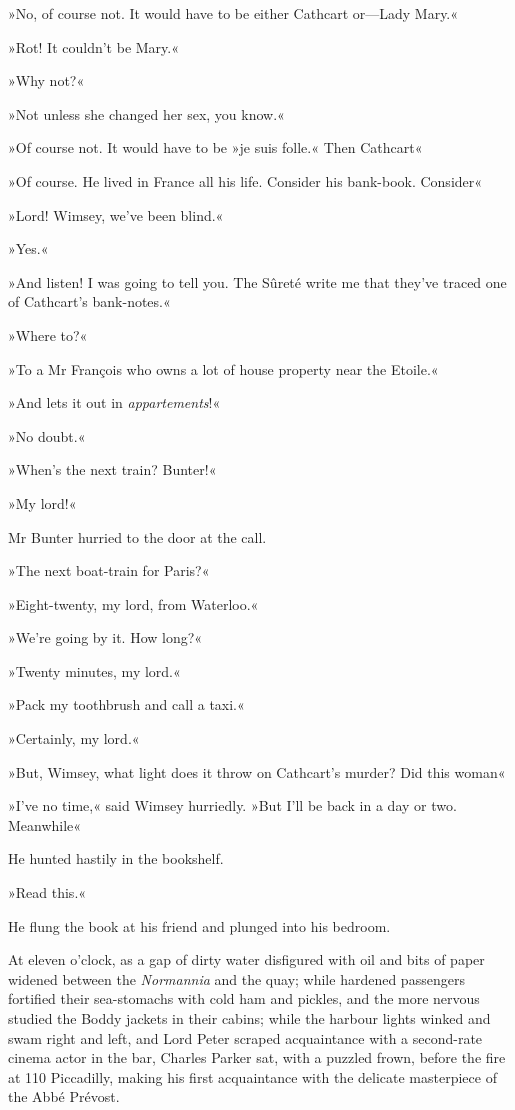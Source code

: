 »No, of course not. It would have to be either Cathcart or—Lady Mary.«

»Rot! It couldn't be Mary.«

»Why not?«

»Not unless she changed her sex, you know.«

»Of course not. It would have to be »je suis folle.« Then Cathcart\longdash«

»Of course. He lived in France all his life. Consider his bank-book. Consider\longdash«

»Lord! Wimsey, we've been blind.«

»Yes.«

»And listen! I was going to tell you. The Sûreté write me that they've traced one of Cathcart's bank-notes.«

»Where to?«

»To a Mr François who owns a lot of house property near the Etoile.«

»And lets it out in \textit{appartements}!«

»No doubt.«

»When's the next train? Bunter!«

»My lord!«

Mr Bunter hurried to the door at the call.

»The next boat-train for Paris?«

»Eight-twenty, my lord, from Waterloo.«

»We're going by it. How long?«

»Twenty minutes, my lord.«

»Pack my toothbrush and call a taxi.«

»Certainly, my lord.«

»But, Wimsey, what light does it throw on Cathcart's murder? Did this woman\longdash«

»I've no time,« said Wimsey hurriedly. »But I'll be back in a day or two. Meanwhile\longdash«

He hunted hastily in the bookshelf.

»Read this.«

He flung the book at his friend and plunged into his bedroom.

At eleven o'clock, as a gap of dirty water disfigured with oil and bits of paper widened between the \textit{Normannia} and the quay; while hardened passengers fortified their sea-stomachs with cold ham and pickles, and the more nervous studied the Boddy jackets in their cabins; while the harbour lights winked and swam right and left, and Lord Peter scraped acquaintance with a second-rate cinema actor in the bar, Charles Parker sat, with a puzzled frown, before the fire at 110 Piccadilly, making his first acquaintance with the delicate masterpiece of the Abbé Prévost.

